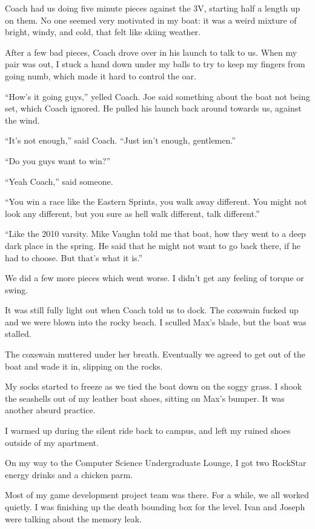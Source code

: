 Coach had us doing five minute pieces against the 3V, starting half a
length up on them.  No one seemed very motivated in my boat: it was a weird
mixture of bright, windy, and cold, that felt like skiing weather.

After a few bad pieces, Coach drove over in his launch to talk to us.  When my
pair was out, I stuck a hand down under my balls to try to keep my fingers from
going numb, which made it hard to control the oar.

``How's it going guys,'' yelled Coach.  Joe said something about the boat not
being set, which Coach ignored.  He pulled his launch back around towards us,
against the wind.


``It's not enough,'' said Coach.  ``Just isn't enough, gentlemen.''

``Do you guys want to win?''

``Yeah Coach,'' said someone.

``You win a race like the Eastern Sprints, you walk away different.  You might
not look any different, but you sure as hell walk different, talk different.''

``Like the 2010 varsity.  Mike Vaughn told me that boat, how they went to a deep
dark place in the spring.  He said that he might not want to go back there, if
he had to choose.  But that's what it is.''

We did a few more pieces which went worse.  I didn't get any feeling of torque
or swing.  

It was still fully light out when Coach told us to dock.  The coxswain fucked up
and we were blown into the rocky beach.  I sculled Max's blade, but the
boat was stalled.

The coxswain muttered under her breath.  Eventually we agreed to get out of the
boat and wade it in, slipping on the rocks.

My socks started to freeze as we tied the boat down on the soggy grass.  I shook
the seashells out of my leather boat shoes, sitting on Max's bumper.  It was
another absurd practice.  

I warmed up during the silent ride back to campus, and left my ruined shoes
outside of my apartment.  

On my way to the Computer Science Undergraduate Lounge, I got two RockStar
energy drinks and a chicken parm.

Most of my game development project team was there.  For a while, we all worked
quietly.  I was finishing up the death bounding box for the level.  Ivan and
Joseph were talking about the memory leak.

